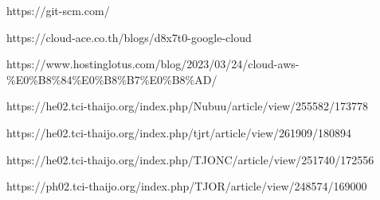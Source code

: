 \begin{thebibliography}{99}
    https://git-scm.com/

    https://cloud-ace.co.th/blogs/d8x7t0-google-cloud

    https://www.hostinglotus.com/blog/2023/03/24/cloud-aws-\%E0\%B8\%84\%E0\%B8\%B7\%E0\%B8\%AD/

    https://he02.tci-thaijo.org/index.php/Nubuu/article/view/255582/173778

    https://he02.tci-thaijo.org/index.php/tjrt/article/view/261909/180894   

    https://he02.tci-thaijo.org/index.php/TJONC/article/view/251740/172556

    https://ph02.tci-thaijo.org/index.php/TJOR/article/view/248574/169000


\end{thebibliography}